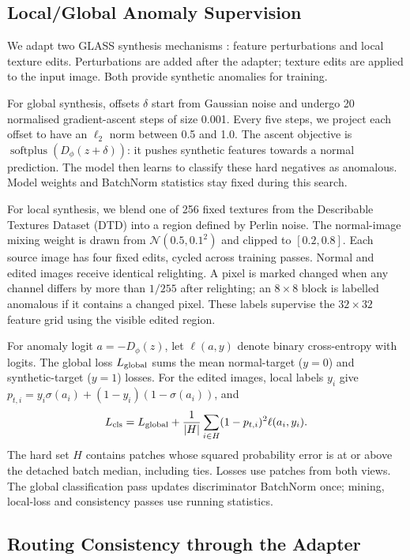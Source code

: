 \documentclass[letterpaper]{article}
\begin{document}
\subsection{Local/Global Anomaly Supervision}

We adapt two GLASS synthesis mechanisms \citep{chen2024glass}: feature perturbations and
local texture edits. Perturbations are added after the adapter; texture edits are applied
to the input image. Both provide synthetic anomalies for training.

For global synthesis, offsets $\delta$ start from Gaussian noise and undergo 20 normalised
gradient-ascent steps of size 0.001. Every five steps, we project each offset to have an
$\ell_2$ norm between 0.5 and 1.0. The ascent objective is
$\operatorname{softplus}(D_\phi(z+\delta))$: it pushes synthetic features towards a normal
prediction. The model then learns to classify these hard negatives as anomalous. Model
weights and BatchNorm statistics stay fixed during this search.

For local synthesis, we blend one of 256 fixed textures from the Describable Textures
Dataset (DTD) \citep{cimpoi2014dtd} into a region defined by Perlin noise. The normal-image
mixing weight is drawn from $\mathcal N(0.5,0.1^2)$ and clipped to $[0.2,0.8]$. Each source
image has four fixed edits, cycled across training passes. Normal and edited images receive
identical relighting. A pixel is marked changed when any channel differs by more than
$1/255$ after relighting; an $8\times8$ block is labelled anomalous if it contains a changed
pixel. These labels supervise the $32\times32$ feature grid using the visible edited region.

For anomaly logit $a=-D_\phi(z)$, let $\ell(a,y)$ denote binary cross-entropy with logits.
The global loss $L_{\rm global}$ sums the mean normal-target ($y=0$) and synthetic-target
($y=1$) losses. For the edited images, local labels $y_i$ give
$p_{t,i}=y_i\sigma(a_i)+(1-y_i)(1-\sigma(a_i))$, and
\begin{equation}
L_{\rm cls}=L_{\rm global} +\frac{1}{|H|}\sum_{i\in H}(1-p_{t,i})^2\ell(a_i,y_i).
\end{equation}
The hard set $H$ contains patches whose squared probability error is at or above the detached
batch median, including ties. Losses use patches from both views. The global classification
pass updates discriminator BatchNorm once; mining, local-loss and consistency passes use
running statistics.

\subsection{Routing Consistency through the Adapter}
\end{document}
